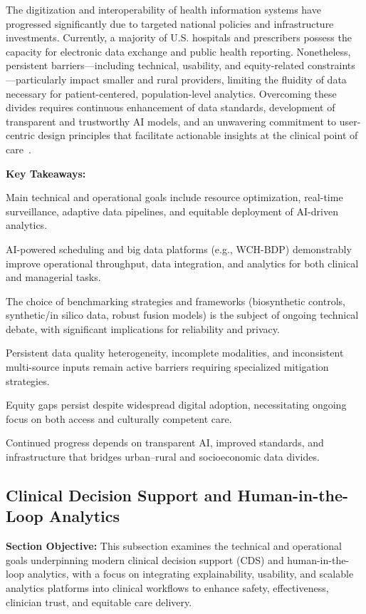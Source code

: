 \documentclass[sigconf]{acmart}
\begin{document}
The digitization and interoperability of health information systems have progressed significantly due to targeted national policies and infrastructure investments. Currently, a majority of U.S. hospitals and prescribers possess the capacity for electronic data exchange and public health reporting. Nonetheless, persistent barriers—including technical, usability, and equity-related constraints—particularly impact smaller and rural providers, limiting the fluidity of data necessary for patient-centered, population-level analytics. Overcoming these divides requires continuous enhancement of data standards, development of transparent and trustworthy AI models, and an unwavering commitment to user-centric design principles that facilitate actionable insights at the clinical point of care~\cite{ref82,ref84}.

\textbf{Key Takeaways:}

Main technical and operational goals include resource optimization, real-time surveillance, adaptive data pipelines, and equitable deployment of AI-driven analytics.

AI-powered scheduling and big data platforms (e.g., WCH-BDP) demonstrably improve operational throughput, data integration, and analytics for both clinical and managerial tasks.

The choice of benchmarking strategies and frameworks (biosynthetic controls, synthetic/in silico data, robust fusion models) is the subject of ongoing technical debate, with significant implications for reliability and privacy.

Persistent data quality heterogeneity, incomplete modalities, and inconsistent multi-source inputs remain active barriers requiring specialized mitigation strategies.

Equity gaps persist despite widespread digital adoption, necessitating ongoing focus on both access and culturally competent care.

Continued progress depends on transparent AI, improved standards, and infrastructure that bridges urban–rural and socioeconomic data divides.

\subsection{Clinical Decision Support and Human-in-the-Loop Analytics}

\textbf{Section Objective:} This subsection examines the technical and operational goals underpinning modern clinical decision support (CDS) and human-in-the-loop analytics, with a focus on integrating explainability, usability, and scalable analytics platforms into clinical workflows to enhance safety, effectiveness, clinician trust, and equitable care delivery.
\end{document}
